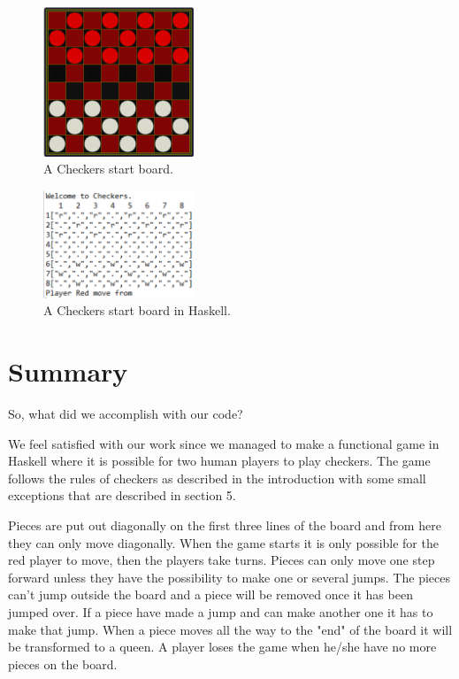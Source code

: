 \documentclass[12pt,a4paper]{article}
\begin{document}
\begin{figure}

  \begin{center}
  	\includegraphics[width= 0.4\textwidth]{Startboarexample.PNG}
  \end{center}
	\caption{A Checkers start board.}
	\label{fig:Checkers}
\end{figure}
\begin{figure}
	\begin{center}
		\includegraphics[width= 0.4\textwidth]{start.PNG}
	\end{center}
	\caption{A Checkers start board in Haskell.}
	\label{fig:Ch}
\end{figure}
\section{Summary}
So, what did we accomplish with our code? 

We feel satisfied with our work since we managed to make a functional game in Haskell where it is possible for two human players to play checkers. The game follows the rules of checkers as described in the introduction with some small exceptions that are described in section 5.

Pieces are put out diagonally on the first three lines of the board and from here they can only move diagonally. When the game starts it is only possible for the red player to move, then the players take turns. Pieces can only move one step forward unless they have the possibility to make one or several jumps. The pieces can’t jump outside the board and a piece will be removed once it has been jumped over. If a piece have made a jump and can make another one it has to make that jump. When a piece moves all the way to the "end" of the board it will be transformed to a queen. A player loses the game when he/she have no more pieces on the board.
\end{document}
